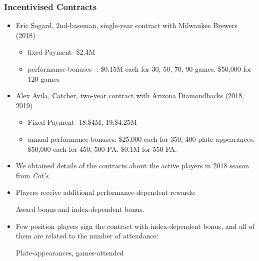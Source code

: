 \documentclass[dvipdfmx,12pt]{beamer}
\begin{document}
\begin{frame}\frametitle{Incentivised Contracts}
  \begin{itemize}
    \footnotesize
    \item Eric Sogard, 2nd-baseman, single-year contract with Milwaukee Brewers (2018)
    \begin{itemize}
      \footnotesize
      \item fixed Payment- \$2.4M

      \item performance bonuses- : \$0.15M each for 30, 50, 70, 90 games. \$50,000 for 120 games
    \end{itemize}
  \end{itemize}

  \begin{itemize}
    \footnotesize
    \item Alex Avila, Catcher, two-year contract with Arizona Diamondbacks (2018, 2019)

    \begin{itemize}
      \footnotesize
      \item Fixed Payment- 18:\$4M, 19:\$4.25M

      \item annual performance bonuses: \$25,000 each for 350, 400 plate appearances. \$50,000 each for 450, 500 PA. \$0.1M for 550 PA.
    \end{itemize}
  \end{itemize}
\end{frame}

\begin{frame}
  \begin{itemize}
    \item We obtained details of the contracts about the active players in 2018 season from \textit{Cot's}.

    \item Players receive additional performance-dependent rewards:

    Award bonus and index-dependent bonus.

    \item Few position players sign the contract with index-dependent bonus, and all of them are related to the number of attendance:

    Plate-appearances, games-attended
  \end{itemize}
\end{frame}
\end{document}
